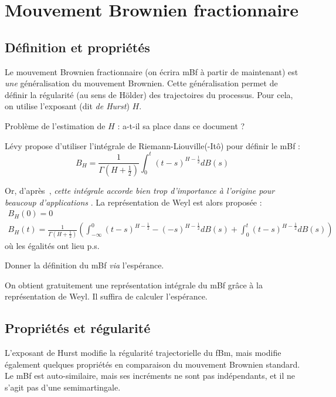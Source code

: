 \section{Mouvement Brownien fractionnaire}
\subsection{Définition et propriétés}

Le mouvement Brownien fractionnaire (on écrira mBf à partir de
maintenant) est \emph{une} gé\-né\-ra\-li\-sa\-tion du mouvement
Brownien. Cette gé\-né\-ra\-li\-sa\-tion permet de définir la
régularité (au sens de Hölder) des trajectoires du processus. Pour
cela, on utilise l'exposant (dit \emph{de Hurst}) $H$.

\begin{question}
  Problème de l'estimation de $H$ : a-t-il sa place dans ce document ?
\end{question}

Lévy propose d'utiliser l'intégrale de Riemann-Liouville(-Itô) pour
définir le mBf :
\begin{equation}
  B_H = \frac{1}{\Gamma(H + \frac{1}{2})} \int_0^t (t-s)^{H-\frac{1}{2}} dB(s)
\end{equation}

Or, d'après~\cite{mandelbrot1968}, \emph{\og cette intégrale accorde
  bien trop d'importance à l'origine pour beaucoup d'applications
  \fg{}}. La re\-pré\-sen\-ta\-tion de Weyl est alors proposée :
\begin{gather}
  B_H(0) = 0\\
  B_H(t) = \frac{1}{\Gamma(H+\frac{1}{2})}\left(\int_{-\infty}^0(t-s)^{H-\frac{1}{2}}-(-s)^{H-\frac{1}{2}}dB(s) + \int_0^t(t-s)^{H-\frac{1}{2}}dB(s) \right)
\end{gather}
où les égalités ont lieu p.s.

\begin{alert}
  Donner la définition du mBf \emph{via} l'espérance.
\end{alert}

\begin{alert}
  On obtient gratuitement une représentation intégrale du mBf grâce à
  la re\-pré\-sen\-ta\-tion de Weyl. Il suffira de calculer l'espérance.
\end{alert}

\subsection{Propriétés et régularité}
L'exposant de Hurst modifie la régularité trajectorielle du fBm, mais
modifie également quelques propriétés en comparaison du mouvement
Brownien standard. Le mBf est auto-similaire, mais ses incréments ne
sont pas indépendants, et il ne s'agit pas d'une semimartingale.

